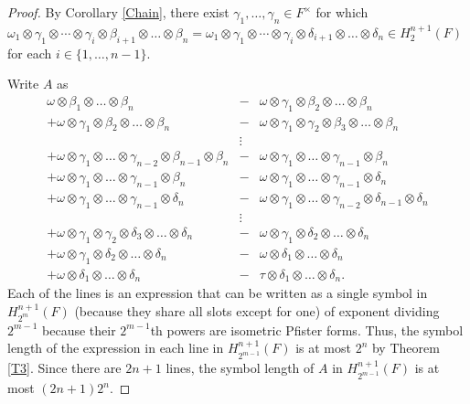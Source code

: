 \documentclass[10pt,a4paper]{amsart}
\begin{document}
\begin{proof}
By Corollary \ref{Chain}, there exist $\gamma_1,\dots,\gamma_n \in F^\times$ for which $\omega_1 \otimes \gamma_1\otimes \cdots \otimes \gamma_i \otimes \beta_{i+1} \otimes \dots \otimes \beta_n=\omega_1 \otimes \gamma_1 \otimes \cdots \otimes \gamma_i \otimes \delta_{i+1} \otimes \dots \otimes \delta_n \in H^{n+1}_2(F)$ for each $i\in \{1,\dots,n-1\}$.

Write $A$ as 
\begin{eqnarray*}
\omega\otimes\beta_1\otimes\dots\otimes\beta_n &-& \omega\otimes \gamma_1 \otimes \beta_2 \otimes \dots\otimes \beta_n \\
+\omega\otimes \gamma_1 \otimes \beta_2 \otimes \dots\otimes \beta_n&-&\omega\otimes \gamma_1 \otimes \gamma_2 \otimes \beta_3 \otimes \dots\otimes \beta_n\\
&\vdots& \\
+\omega\otimes \gamma_1 \otimes \dots \otimes \gamma_{n-2}  \otimes \beta_{n-1} \otimes \beta_n&-&\omega\otimes \gamma_1 \otimes \dots \otimes \gamma_{n-1} \otimes \beta_n\\
+\omega\otimes \gamma_1 \otimes \dots \otimes \gamma_{n-1} \otimes \beta_n & - & \omega\otimes \gamma_1 \otimes \dots \otimes \gamma_{n-1} \otimes \delta_n\\
+\omega\otimes \gamma_1 \otimes \dots \otimes \gamma_{n-1} \otimes \delta_n& -& \omega\otimes \gamma_1 \otimes \dots \otimes \gamma_{n-2}  \otimes \delta_{n-1} \otimes \delta_n\\
& \vdots &\\
+\omega\otimes \gamma_1 \otimes \gamma_2 \otimes \delta_3 \otimes \dots\otimes \delta_n &-& \omega\otimes \gamma_1 \otimes \delta_2 \otimes \dots\otimes \delta_n\\
+\omega\otimes \gamma_1 \otimes \delta_2 \otimes \dots\otimes \delta_n &-&\omega\otimes \delta_1 \otimes \dots\otimes \delta_n\\
+\omega\otimes \delta_1 \otimes \dots\otimes \delta_n &-&\tau\otimes \delta_1 \otimes \dots\otimes \delta_n.
\end{eqnarray*}
Each of the lines is an expression that can be written as a single symbol in $H_{2^m}^{n+1}(F)$ (because they share all slots except for one) of exponent dividing $2^{m-1}$ because their $2^{m-1}$th powers are isometric Pfister forms. Thus, the symbol length of the expression in each line in $H_{2^{m-1}}^{n+1}(F)$ is at most $2^n$ by Theorem \ref{T3}. Since there are $2n+1$ lines, the symbol length of $A$ in $H_{2^{m-1}}^{n+1}(F)$ is at most $(2n+1)2^n$.
\end{proof}
\end{document}
